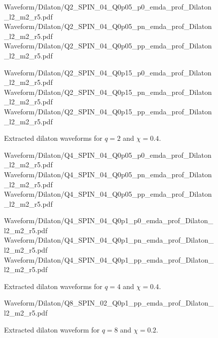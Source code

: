 \begin{figure}[p]
\centering

{Waveform/Dilaton/Q2_SPIN_04_Q0p05_p0_emda_prof_Dilaton_l2_m2_r5.pdf}
\hfill
{}
{Waveform/Dilaton/Q2_SPIN_04_Q0p05_pn_emda_prof_Dilaton_l2_m2_r5.pdf}
\hfill
{}
{Waveform/Dilaton/Q2_SPIN_04_Q0p05_pp_emda_prof_Dilaton_l2_m2_r5.pdf}

\vspace{0.6em}

{Waveform/Dilaton/Q2_SPIN_04_Q0p15_p0_emda_prof_Dilaton_l2_m2_r5.pdf}
\hfill
{}
{Waveform/Dilaton/Q2_SPIN_04_Q0p15_pn_emda_prof_Dilaton_l2_m2_r5.pdf}
\hfill
{}
{Waveform/Dilaton/Q2_SPIN_04_Q0p15_pp_emda_prof_Dilaton_l2_m2_r5.pdf}

\caption{Extracted dilaton waveforms for $q=2$ and $\chi=0.4$.}
\label{fig:dilaton_catalog_q2_chi04}
\end{figure}

\begin{figure}[p]
\centering

{Waveform/Dilaton/Q4_SPIN_04_Q0p05_p0_emda_prof_Dilaton_l2_m2_r5.pdf}
\hfill
{}
{Waveform/Dilaton/Q4_SPIN_04_Q0p05_pn_emda_prof_Dilaton_l2_m2_r5.pdf}
\hfill
{}
{Waveform/Dilaton/Q4_SPIN_04_Q0p05_pp_emda_prof_Dilaton_l2_m2_r5.pdf}
\vspace{0.6em}

{Waveform/Dilaton/Q4_SPIN_04_Q0p1_p0_emda_prof_Dilaton_l2_m2_r5.pdf}
\hfill
{}
{Waveform/Dilaton/Q4_SPIN_04_Q0p1_pn_emda_prof_Dilaton_l2_m2_r5.pdf}
\hfill
{}
{Waveform/Dilaton/Q4_SPIN_04_Q0p1_pp_emda_prof_Dilaton_l2_m2_r5.pdf}
\caption{Extracted dilaton waveforms for $q=4$ and $\chi=0.4$.}
\label{fig:dilaton_catalog_q4_chi04}
\end{figure}

\begin{figure}[p]
\centering

{Waveform/Dilaton/Q8_SPIN_02_Q0p1_pp_emda_prof_Dilaton_l2_m2_r5.pdf}

\caption{Extracted dilaton waveform for $q=8$ and $\chi=0.2$.}
\label{fig:dilaton_catalog_q8_chi02}
\end{figure}
